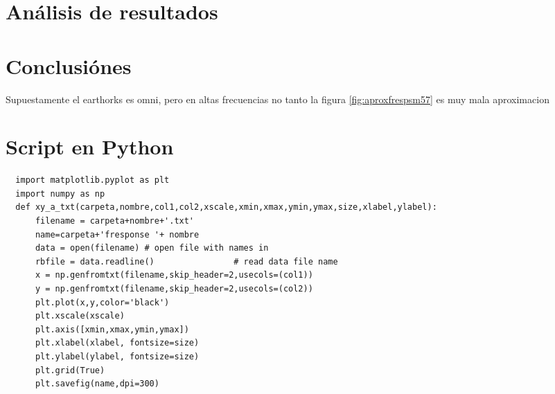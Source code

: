 \documentclass[]{article}
\begin{document}
\begin{multicols}{2}
\section{Análisis de resultados}

\lipsum[1]

\lipsum[2]

\section{Conclusiónes}
\lipsum[1]

\lipsum[2]
Supuestamente el earthorks es omni, pero en altas frecuencias no tanto
la figura \ref{fig:aproxfrespsm57} es muy mala aproximacion
\printbibliography

\end{multicols}

\newpage
\appendix
\section{Script en Python}
\begin{verbatim}
  import matplotlib.pyplot as plt
  import numpy as np
  def xy_a_txt(carpeta,nombre,col1,col2,xscale,xmin,xmax,ymin,ymax,size,xlabel,ylabel):
      filename = carpeta+nombre+'.txt'
      name=carpeta+'fresponse '+ nombre
      data = open(filename) # open file with names in
      rbfile = data.readline()                # read data file name
      x = np.genfromtxt(filename,skip_header=2,usecols=(col1))
      y = np.genfromtxt(filename,skip_header=2,usecols=(col2))
      plt.plot(x,y,color='black')
      plt.xscale(xscale)
      plt.axis([xmin,xmax,ymin,ymax])
      plt.xlabel(xlabel, fontsize=size)
      plt.ylabel(ylabel, fontsize=size)
      plt.grid(True)
      plt.savefig(name,dpi=300)

\end{verbatim}
\end{document}
